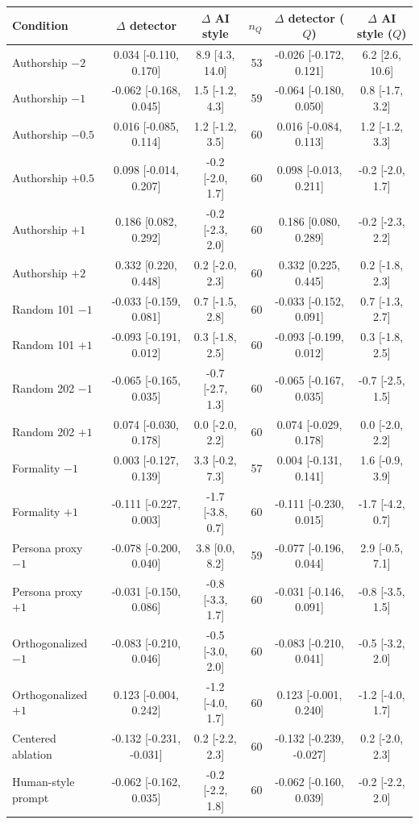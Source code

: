 \begin{tabular}{lccrcc}
\toprule
Condition & $\Delta$ detector & $\Delta$ AI style & $n_Q$ & $\Delta$ detector ($Q$) & $\Delta$ AI style ($Q$) \\
\midrule
Authorship $-2$ & 0.034 [-0.110, 0.170] & 8.9 [4.3, 14.0] & 53 & -0.026 [-0.172, 0.121] & 6.2 [2.6, 10.6] \\
Authorship $-1$ & -0.062 [-0.168, 0.045] & 1.5 [-1.2, 4.3] & 59 & -0.064 [-0.180, 0.050] & 0.8 [-1.7, 3.2] \\
Authorship $-0.5$ & 0.016 [-0.085, 0.114] & 1.2 [-1.2, 3.5] & 60 & 0.016 [-0.084, 0.113] & 1.2 [-1.2, 3.3] \\
Authorship $+0.5$ & 0.098 [-0.014, 0.207] & -0.2 [-2.0, 1.7] & 60 & 0.098 [-0.013, 0.211] & -0.2 [-2.0, 1.7] \\
Authorship $+1$ & 0.186 [0.082, 0.292] & -0.2 [-2.3, 2.0] & 60 & 0.186 [0.080, 0.289] & -0.2 [-2.3, 2.2] \\
Authorship $+2$ & 0.332 [0.220, 0.448] & 0.2 [-2.0, 2.3] & 60 & 0.332 [0.225, 0.445] & 0.2 [-1.8, 2.3] \\
Random 101 $-1$ & -0.033 [-0.159, 0.081] & 0.7 [-1.5, 2.8] & 60 & -0.033 [-0.152, 0.091] & 0.7 [-1.3, 2.7] \\
Random 101 $+1$ & -0.093 [-0.191, 0.012] & 0.3 [-1.8, 2.5] & 60 & -0.093 [-0.199, 0.012] & 0.3 [-1.8, 2.5] \\
Random 202 $-1$ & -0.065 [-0.165, 0.035] & -0.7 [-2.7, 1.3] & 60 & -0.065 [-0.167, 0.035] & -0.7 [-2.5, 1.5] \\
Random 202 $+1$ & 0.074 [-0.030, 0.178] & 0.0 [-2.0, 2.2] & 60 & 0.074 [-0.029, 0.178] & 0.0 [-2.0, 2.2] \\
Formality $-1$ & 0.003 [-0.127, 0.139] & 3.3 [-0.2, 7.3] & 57 & 0.004 [-0.131, 0.141] & 1.6 [-0.9, 3.9] \\
Formality $+1$ & -0.111 [-0.227, 0.003] & -1.7 [-3.8, 0.7] & 60 & -0.111 [-0.230, 0.015] & -1.7 [-4.2, 0.7] \\
Persona proxy $-1$ & -0.078 [-0.200, 0.040] & 3.8 [0.0, 8.2] & 59 & -0.077 [-0.196, 0.044] & 2.9 [-0.5, 7.1] \\
Persona proxy $+1$ & -0.031 [-0.150, 0.086] & -0.8 [-3.3, 1.7] & 60 & -0.031 [-0.146, 0.091] & -0.8 [-3.5, 1.5] \\
Orthogonalized $-1$ & -0.083 [-0.210, 0.046] & -0.5 [-3.0, 2.0] & 60 & -0.083 [-0.210, 0.041] & -0.5 [-3.2, 2.0] \\
Orthogonalized $+1$ & 0.123 [-0.004, 0.242] & -1.2 [-4.0, 1.7] & 60 & 0.123 [-0.001, 0.240] & -1.2 [-4.0, 1.7] \\
Centered ablation & -0.132 [-0.231, -0.031] & 0.2 [-2.2, 2.3] & 60 & -0.132 [-0.239, -0.027] & 0.2 [-2.0, 2.3] \\
Human-style prompt & -0.062 [-0.162, 0.035] & -0.2 [-2.2, 1.8] & 60 & -0.062 [-0.160, 0.039] & -0.2 [-2.2, 2.0] \\
\bottomrule
\end{tabular}
